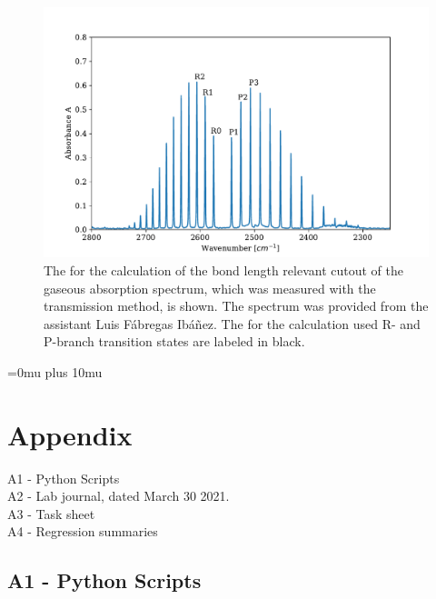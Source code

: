 \documentclass[a4paper,abstracton]{article}	                       %
\begin{document}
\begin{figure}[H]
\centering
 \includegraphics[width=\textwidth] {TeilG.pdf}
\caption{\label{fig:TeilG}The for the calculation of the bond length relevant cutout of the gaseous  absorption spectrum, which was measured with the transmission method, is shown. The spectrum was provided from the assistant Luis F\'abregas Ib\'a\~nez. The for the calculation used R- and P-branch transition states are labeled in black.}
\end{figure}

\pagebreak

\setcounter{biburllcpenalty}{7000}
\setcounter{biburlucpenalty}{8000}
\Urlmuskip=0mu plus 10mu
\printbibliography

 

 \newpage 
  
\section*{Appendix}
A1 - Python Scripts\\
A2 - Lab journal, dated March 30 2021.\\
A3 - Task sheet \\
A4 - Regression summaries


\subsection*{A1 - Python Scripts}
\end{document}
